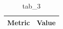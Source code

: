 \begin{table}[htbp]
\centering
\caption{tab_3}
\label{tab:tab_3}
\begin{tabular}{ll}
\toprule
Metric & Value \\
\midrule
\bottomrule
\end{tabular}
\end{table}